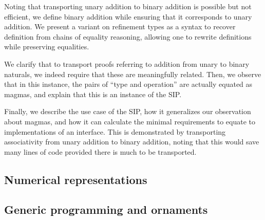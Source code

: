 Noting that transporting unary addition to binary addition is possible but not efficient, we define binary addition while ensuring that it corresponds to unary addition. We present a variant on refinement types as a syntax to recover definition from chains of equality reasoning, allowing one to rewrite definitions while preserving equalities.

We clarify that to transport proofs referring to addition from unary to binary naturals, we indeed require that these are meaningfully related. Then, we observe that in this instance, the pairs of ``type and operation'' are actually equated as magmas, and explain that this is an instance of the SIP.

Finally, we describe the use case of the SIP, how it generalizes our observation about magmas, and how it can calculate the minimal requirements to equate to implementations of an interface. This is demonstrated by transporting associativity from unary addition to binary addition, noting that this would save many lines of code provided there is much to be transported.






\subsection{Numerical representations}

\subsection{Generic programming and ornaments}

